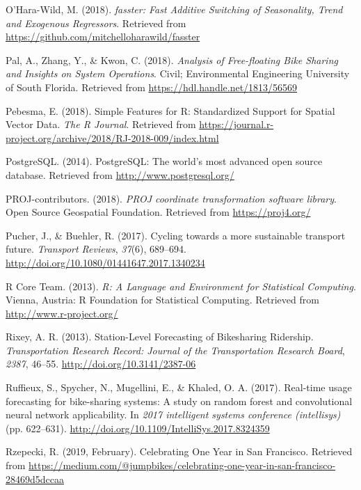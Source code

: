 \documentclass[12pt,oneside]{reedthesis}
\begin{document}
\hypertarget{ref-fasster}{}
O'Hara-Wild, M. (2018). \emph{fasster: Fast Additive Switching of
Seasonality, Trend and Exogenous Regressors}. Retrieved from
\url{https://github.com/mitchelloharawild/fasster}

\hypertarget{ref-pal2018}{}
Pal, A., Zhang, Y., \& Kwon, C. (2018). \emph{Analysis of Free-floating
Bike Sharing and Insights on System Operations}. Civil; Environmental
Engineering University of South Florida. Retrieved from
\url{https://hdl.handle.net/1813/56569}

\hypertarget{ref-sf}{}
Pebesma, E. (2018). Simple Features for R: Standardized Support for
Spatial Vector Data. \emph{The R Journal}. Retrieved from
\url{https://journal.r-project.org/archive/2018/RJ-2018-009/index.html}

\hypertarget{ref-postgres}{}
PostgreSQL. (2014). PostgreSQL: The world's most advanced open source
database. Retrieved from \url{http://www.postgresql.org/}

\hypertarget{ref-proj}{}
PROJ-contributors. (2018). \emph{PROJ coordinate transformation software
library}. Open Source Geospatial Foundation. Retrieved from
\url{https://proj4.org/}

\hypertarget{ref-pucher2017}{}
Pucher, J., \& Buehler, R. (2017). Cycling towards a more sustainable
transport future. \emph{Transport Reviews}, \emph{37}(6), 689--694.
\url{http://doi.org/10.1080/01441647.2017.1340234}

\hypertarget{ref-rlanguage}{}
R Core Team. (2013). \emph{R: A Language and Environment for Statistical
Computing}. Vienna, Austria: R Foundation for Statistical Computing.
Retrieved from \url{http://www.r-project.org/}

\hypertarget{ref-rixley2013}{}
Rixey, A. R. (2013). Station-Level Forecasting of Bikesharing Ridership.
\emph{Transportation Research Record: Journal of the Transportation
Research Board}, \emph{2387}, 46--55.
\url{http://doi.org/10.3141/2387-06}

\hypertarget{ref-ruffieux2017}{}
Ruffieux, S., Spycher, N., Mugellini, E., \& Khaled, O. A. (2017).
Real-time usage forecasting for bike-sharing systems: A study on random
forest and convolutional neural network applicability. In \emph{2017
intelligent systems conference (intellisys)} (pp. 622--631).
\url{http://doi.org/10.1109/IntelliSys.2017.8324359}

\hypertarget{ref-jump2019}{}
Rzepecki, R. (2019, February). Celebrating One Year in San Francisco.
Retrieved from
\url{https://medium.com/@jumpbikes/celebrating-one-year-in-san-francisco-28469d5dccaa}
\end{document}
